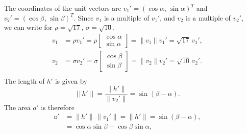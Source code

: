 \documentclass[graybox]{svmult}
\begin{document}
The coordinates of the unit vectors
are $v_1'=(\cos\alpha,\,\sin\alpha)^T$ and $v_2'=(\cos\beta,\,
\sin\beta)^T$.  Since $v_1$ is a multiple of $v_1'$, and $v_2$ is a
multiple of $v_2'$, we can write for $\rho=\sqrt{17}$, $\sigma=\sqrt{10}$,
\begin{align*}
v_1 &= \rho v_1' = \rho \left[\begin{array}{c}\cos\alpha\\\sin\alpha\end{array}\right] = \| v_1\| v_1' = \sqrt{17}\, v_1',\\
v_2 &= \sigma v_2' = \sigma \left[\begin{array}{c}\cos\beta\\\sin\beta\end{array}\right] = \| v_2\| v_2' = \sqrt{10}\, v_2'.\\
\end{align*}
The length of $h'$ is given by
\[
\| h'\| = \frac{\| h'\|}{\| v_2'\|} = \sin(\beta-\alpha).
\]
The area $a'$ is therefore
\begin{align*}
a' &= \| h'\|\, \|v_1'\| = \| h'\| = \sin(\beta-\alpha),\\
 &= \cos\alpha \sin\beta - \cos\beta\sin\alpha,
\end{align*}
\end{document}
